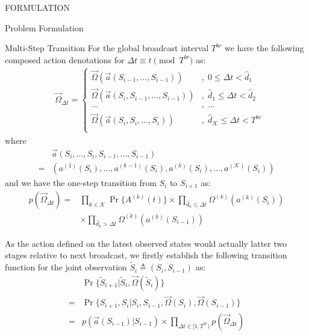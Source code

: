 \documentclass[10pt, conference, letterpaper]{IEEEtran}
\begin{document}
\begin{section}{FORMULATION}
\begin{subsection}{Problem Formulation}
\begin{subsubsection}{Multi-Step Transition}
                For the global broadcast interval $T^{br}$ we have the following composed action denotations for $\Delta{t} \equiv t \pmod{T^{br}}$ as:
                \begin{align}
                    &\vec{\Omega}_{\Delta{t}} = 
                    \begin{cases}
                        \vec{\Omega}(\vec{a}(S_{i-1}, \dots, S_{i-1})) &,\; 0 \leq \Delta{t} < \hat{d}_1 \\
                        \vec{\Omega}(\vec{a}(S_{i}, S_{i-1}, \dots, S_{i-1})) &,\; \hat{d}_1 \leq \Delta{t}< \hat{d}_2 \\
                        \dots &,\; \dots \\
                        \vec{\Omega}(\vec{a}(S_{i}, S_{i}, \dots, S_{i})) &,\; \hat{d}_{\mathcal{K}} \leq \Delta{t} < T^{br} \\
                    \end{cases}
                \end{align}
                where
                \begin{align}
                    & \vec{a}(S_i,\dots, S_i,S_{i-1}, \dots,S_{i-1})
                    \nonumber\\
                    = & (a^{(1)}(S_i),\dots,a^{(k-1)}(S_i), a^{(k)}(S_i),\dots,a^{(\mathcal{K})}(S_i))
                \end{align}
                and we have the one-step transition from $S_{i}$ to $S_{i+1}$ as:
                \begin{align}
                    p(\vec{\Omega}_{\Delta{t}}) =& \prod_{k\in\mathcal{K}}{\Pr\{A^{(k)}(t)\}} \times \prod_{\hat{d}_k \leq \Delta{t}} { \Omega^{(k)}(a^{(k)}(S_{i}))}
                    \nonumber \\
                    & \times \prod_{\hat{d}_k > \Delta{t}} { \Omega^{(k)}(a^{(k)}(S_{i-1})) }
                \end{align}

                As the action defined on the latest observed states would actually latter two stages relative to next broadcast, we firstly establish the following transition function for the joint observation $\tilde{S}_i \triangleq (S_{i}, S_{i-1})$ as:
                \begin{align}
                    & \Pr\{\tilde{S}_{i+1} | \tilde{S}_{i}, \vec{\Omega}(\tilde{S}_i)\}
                    \nonumber\\
                    = & \Pr\{S_{i+1}, S_{i} | S_{i},S_{i-1}, \vec{\Omega}(S_{i}), \vec{\Omega}(S_{i-1})\}
                    \nonumber\\
                    = & p(\vec{a}(S_{i-1})|S_{i-1}) \times \prod_{\Delta{t} \in [1,T^{br})} p(\vec{\Omega}_{\Delta{t}})
                \end{align}
            \end{subsubsection}


\end{subsection}
\end{section}
\end{document}

